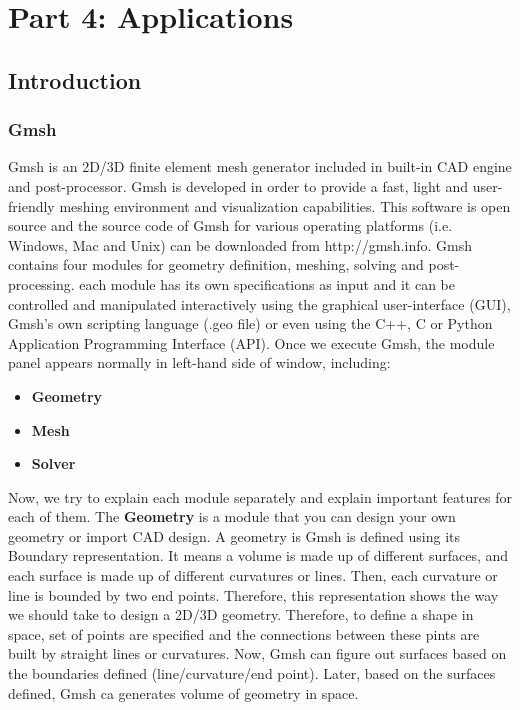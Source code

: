 \part{Part 4: Applications}

\graphicspath{ {./Pictures/} }

\chapter{Introduction}
\section{Gmsh}
Gmsh is an 2D/3D finite element mesh generator included in built-in CAD engine and post-processor. Gmsh is developed in order to provide a fast, light and user-friendly meshing environment and visualization capabilities. This software is open source and the source code of Gmsh for various operating platforms (i.e. Windows, Mac and Unix) can be downloaded from http://gmsh.info. Gmsh contains four modules for geometry definition, meshing, solving and post-processing. each module has its own specifications as input and it can be controlled and manipulated interactively using the graphical user-interface (GUI), Gmsh's own scripting language (.geo file) or even using the C++, C or Python Application Programming Interface (API).
Once we execute Gmsh, the module panel appears normally in left-hand side of window, including:
\begin{itemize}
    \item \textbf{Geometry}
    \item \textbf{Mesh}
    \item \textbf{Solver}
\end{itemize}
Now, we try to explain each module separately and explain important features for each of them. The \textbf{Geometry} is a module that you can design your own geometry or import CAD design. A geometry is Gmsh is defined using its Boundary representation. It means a volume is made up of different surfaces, and each surface is made up of different curvatures or lines. Then, each curvature or line is bounded by two end points. Therefore, this representation shows the way we should take to design a 2D/3D geometry.
Therefore, to define a shape in space, set of points are specified and the connections between these pints are built by straight lines or curvatures. Now, Gmsh can figure out surfaces based on the boundaries defined (line/curvature/end point). Later, based on the surfaces defined, Gmsh ca generates volume of geometry in space.

